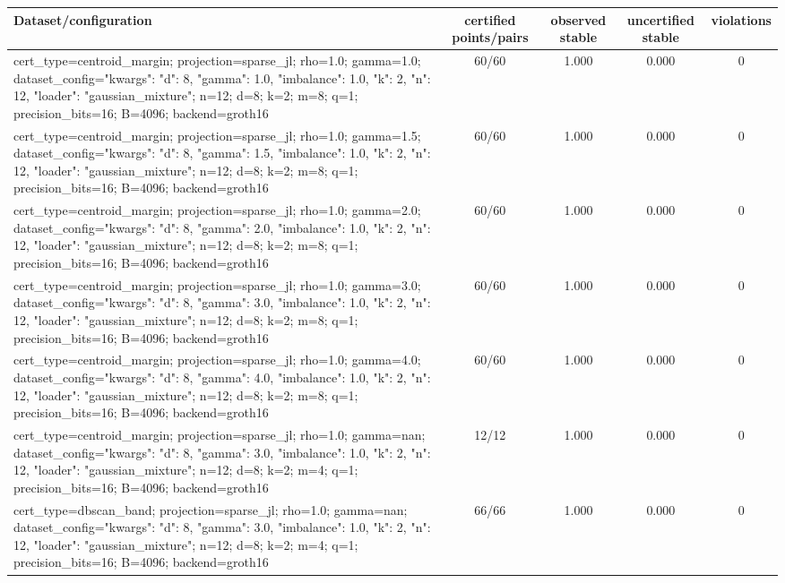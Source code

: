 \begin{tabular}{lcccc}
\toprule
Dataset/configuration & certified points/pairs & observed stable & uncertified stable & violations \\
\midrule
cert\_type=centroid\_margin; projection=sparse\_jl; rho=1.0; gamma=1.0; dataset\_config={"kwargs": {"d": 8, "gamma": 1.0, "imbalance": 1.0, "k": 2, "n": 12}, "loader": "gaussian\_mixture"}; n=12; d=8; k=2; m=8; q=1; precision\_bits=16; B=4096; backend=groth16 & 60/60 & 1.000 & 0.000 & 0 \\
cert\_type=centroid\_margin; projection=sparse\_jl; rho=1.0; gamma=1.5; dataset\_config={"kwargs": {"d": 8, "gamma": 1.5, "imbalance": 1.0, "k": 2, "n": 12}, "loader": "gaussian\_mixture"}; n=12; d=8; k=2; m=8; q=1; precision\_bits=16; B=4096; backend=groth16 & 60/60 & 1.000 & 0.000 & 0 \\
cert\_type=centroid\_margin; projection=sparse\_jl; rho=1.0; gamma=2.0; dataset\_config={"kwargs": {"d": 8, "gamma": 2.0, "imbalance": 1.0, "k": 2, "n": 12}, "loader": "gaussian\_mixture"}; n=12; d=8; k=2; m=8; q=1; precision\_bits=16; B=4096; backend=groth16 & 60/60 & 1.000 & 0.000 & 0 \\
cert\_type=centroid\_margin; projection=sparse\_jl; rho=1.0; gamma=3.0; dataset\_config={"kwargs": {"d": 8, "gamma": 3.0, "imbalance": 1.0, "k": 2, "n": 12}, "loader": "gaussian\_mixture"}; n=12; d=8; k=2; m=8; q=1; precision\_bits=16; B=4096; backend=groth16 & 60/60 & 1.000 & 0.000 & 0 \\
cert\_type=centroid\_margin; projection=sparse\_jl; rho=1.0; gamma=4.0; dataset\_config={"kwargs": {"d": 8, "gamma": 4.0, "imbalance": 1.0, "k": 2, "n": 12}, "loader": "gaussian\_mixture"}; n=12; d=8; k=2; m=8; q=1; precision\_bits=16; B=4096; backend=groth16 & 60/60 & 1.000 & 0.000 & 0 \\
cert\_type=centroid\_margin; projection=sparse\_jl; rho=1.0; gamma=nan; dataset\_config={"kwargs": {"d": 8, "gamma": 3.0, "imbalance": 1.0, "k": 2, "n": 12}, "loader": "gaussian\_mixture"}; n=12; d=8; k=2; m=4; q=1; precision\_bits=16; B=4096; backend=groth16 & 12/12 & 1.000 & 0.000 & 0 \\
cert\_type=dbscan\_band; projection=sparse\_jl; rho=1.0; gamma=nan; dataset\_config={"kwargs": {"d": 8, "gamma": 3.0, "imbalance": 1.0, "k": 2, "n": 12}, "loader": "gaussian\_mixture"}; n=12; d=8; k=2; m=4; q=1; precision\_bits=16; B=4096; backend=groth16 & 66/66 & 1.000 & 0.000 & 0 \\
\bottomrule
\end{tabular}
